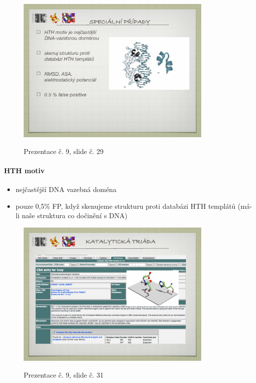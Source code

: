 \documentclass[DIV=8]{scrreprt}
\begin{document}
\begin{figure}
    \caption{Prezentace č. 9, slide č. 29}
    \includegraphics[width=0.85\textwidth]{slides-9/slide-29.jpg}
    \centering
    \label{slides-9-slide-29}
\end{figure}

\paragraph{HTH motiv}
\begin{itemize}[nosep]
    \item nejčastější DNA vazebná doména
    \item pouze 0,5\% FP, když skenujeme strukturu proti databázi HTH templátů (má-li naše struktura co dočinění s DNA)
\end{itemize}



\begin{figure}
    \caption{Prezentace č. 9, slide č. 31}
    \includegraphics[width=0.85\textwidth]{slides-9/slide-31.jpg}
    \centering
    \label{slides-9-slide-31}
\end{figure}
\end{document}
